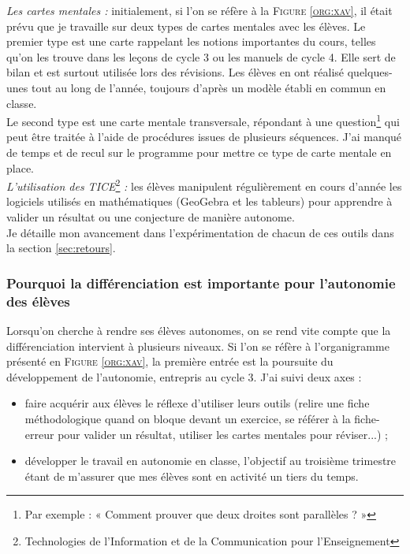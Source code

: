\textit{Les cartes mentales :} initialement, si l'on se réfère à la  \textsc{Figure \ref{org:xav}}, il était prévu que je travaille sur deux types de cartes mentales avec les élèves. Le premier type est une carte rappelant les notions importantes du cours, telles qu'on les trouve dans les leçons de cycle 3 ou les manuels de cycle 4. Elle sert de bilan et est surtout utilisée lors des révisions. Les élèves en ont réalisé quelques-unes tout au long de l'année, toujours d'après un modèle établi en commun en classe. \\
	Le second type est une carte mentale transversale, répondant à une question\footnote{Par exemple : « Comment prouver que deux droites sont parallèles ? »} qui peut être traitée à l'aide de procédures issues de plusieurs séquences. J'ai manqué de temps et de recul sur le programme pour mettre ce type de carte mentale en place.\\
	
\textit{L'utilisation des TICE}\footnote{Technologies de l'Information et de la Communication pour l'Enseignement} \textit{:} les élèves manipulent régulièrement en cours d'année les logiciels utilisés en mathématiques (GeoGebra et les tableurs) pour apprendre à valider un résultat ou une conjecture de manière autonome.\\

\noindent Je détaille mon avancement dans l'expérimentation de chacun de ces outils dans la section \ref{sec:retours}.

\subsubsection{Pourquoi la différenciation est importante pour l'autonomie des élèves}

Lorsqu'on cherche à rendre ses élèves autonomes, on se rend vite compte que la différenciation intervient à plusieurs niveaux. Si l'on se réfère à l'organigramme présenté en \textsc{Figure \ref{org:xav}}, la première entrée est la poursuite du développement de l'autonomie, entrepris au cycle 3. J'ai suivi deux axes :
\begin{itemize}
    \item faire acquérir aux élèves le réflexe d'utiliser leurs outils (relire une fiche méthodologique quand on bloque devant un exercice, se référer à la fiche-erreur pour valider un résultat, utiliser les cartes mentales pour réviser...) ;
    \item développer le travail en autonomie en classe, l'objectif au troisième trimestre étant de m'assurer que mes élèves sont en activité un tiers du temps.
\end{itemize}

